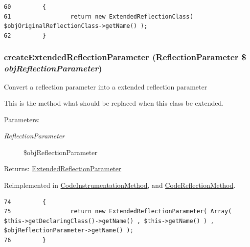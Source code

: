 \begin{Code}\begin{verbatim}60         {
61                 return new ExtendedReflectionClass( $objOriginalReflectionClass->getName() );
62         }
\end{verbatim}
\end{Code}


\hypertarget{class_extended_reflection_method_98ceb248f2b535a3a83ac2e7990e0c1f}{
\subsubsection[{createExtendedReflectionParameter}]{\setlength{\rightskip}{0pt plus 5cm}createExtendedReflectionParameter (ReflectionParameter \$ {\em objReflectionParameter})}}
\label{class_extended_reflection_method_98ceb248f2b535a3a83ac2e7990e0c1f}


Convert a reflection parameter into a extended reflection parameter

This is the method what should be replaced when this class be extended.

\begin{Desc}
\item[Parameters:]
\begin{description}
\item[{\em ReflectionParameter}]\$objReflectionParameter \end{description}
\end{Desc}
\begin{Desc}
\item[Returns:]\hyperlink{class_extended_reflection_parameter}{ExtendedReflectionParameter} \end{Desc}


Reimplemented in \hyperlink{class_code_instrumentation_method_98ceb248f2b535a3a83ac2e7990e0c1f}{CodeInstrumentationMethod}, and \hyperlink{class_code_reflection_method_98ceb248f2b535a3a83ac2e7990e0c1f}{CodeReflectionMethod}.

\begin{Code}\begin{verbatim}74         {
75                 return new ExtendedReflectionParameter( Array( $this->getDeclaringClass()->getName() , $this->getName() ) , $objReflectionParameter->getName() );
76         }
\end{verbatim}
\end{Code}


